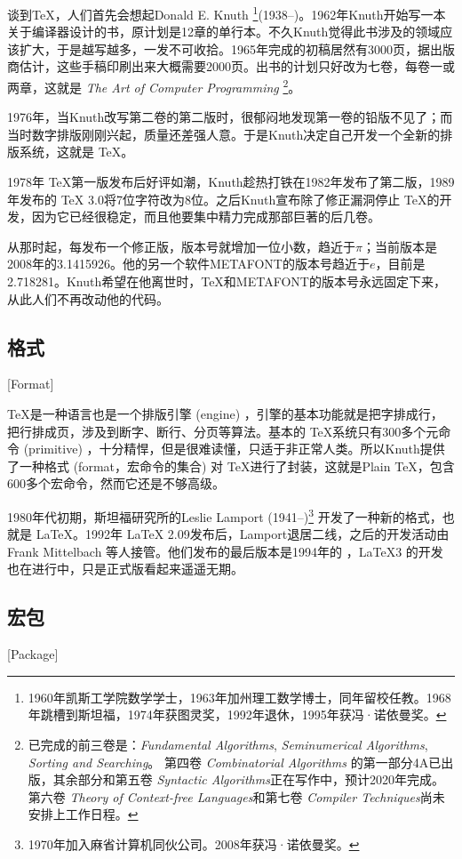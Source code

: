 谈到\TeX{}，人们首先会想起Donald E. Knuth \footnote{1960年凯斯工学院数学学士，1963年加州理工数学博士，同年留校任教。1968年跳槽到斯坦福，1974年获图灵奖，1992年退休，1995年获冯·诺依曼奖。}(1938--)。1962年Knuth开始写一本关于编译器设计的书，原计划是12章的单行本。不久Knuth觉得此书涉及的领域应该扩大，于是越写越多，一发不可收拾。1965年完成的初稿居然有3000页，据出版商估计，这些手稿印刷出来大概需要2000页。出书的计划只好改为七卷，每卷一或两章，这就是 \emph{The Art of Computer Programming} \footnote{已完成的前三卷是：\emph{Fundamental Algorithms}, \emph{Seminumerical Algorithms}, \emph{Sorting and Searching}。 第四卷 \emph{Combinatorial Algorithms} 的第一部分4A已出版，其余部分和第五卷 \emph{Syntactic Algorithms}正在写作中，预计2020年完成。第六卷 \emph{Theory of Context-free Languages}和第七卷 \emph{Compiler Techniques}尚未安排上工作日程。}。

1976年，当Knuth改写第二卷的第二版时，很郁闷地发现第一卷的铅版不见了；而当时数字排版刚刚兴起，质量还差强人意。于是Knuth决定自己开发一个全新的排版系统，这就是 \TeX。

1978年 \TeX 第一版发布后好评如潮，Knuth趁热打铁在1982年发布了第二版，1989年发布的 \TeX{} 3.0将7位字符改为8位。之后Knuth宣布除了修正漏洞停止 \TeX 的开发，因为它已经很稳定，而且他要集中精力完成那部巨著的后几卷。

从那时起，每发布一个修正版，版本号就增加一位小数，趋近于$\pi$；当前版本是2008年的3.1415926。他的另一个软件METAFONT的版本号趋近于$e$，目前是2.718281。Knuth希望在他离世时，\TeX 和METAFONT的版本号永远固定下来，从此人们不再改动他的代码。

\subsection{格式}[Format]

\TeX 是一种语言也是一个排版引擎 (engine) ，引擎的基本功能就是把字排成行，把行排成页，涉及到断字、断行、分页等算法。基本的 \TeX 系统只有300多个元命令 (primitive) ，十分精悍，但是很难读懂，只适于非正常人类。所以Knuth提供了一种格式 (format，宏命令的集合) 对 \TeX 进行了封装，这就是Plain \TeX ，包含600多个宏命令，然而它还是不够高级。

1980年代初期，斯坦福研究所的Leslie Lamport (1941--)\footnote{1970年加入麻省计算机同伙公司。2008年获冯·诺依曼奖。} 开发了一种新的格式，也就是 \LaTeX。1992年 \LaTeX{} 2.09发布后，Lamport退居二线，之后的开发活动由Frank Mittelbach 等人接管。他们发布的最后版本是1994年的 \LaTeXe，\LaTeX 3 的开发也在进行中，只是正式版看起来遥遥无期。

\subsection{宏包}[Package]


